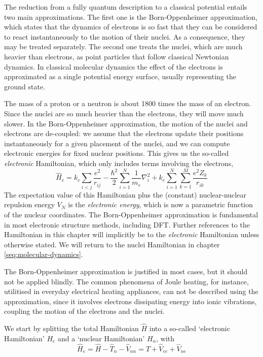 \documentclass[11pt,bibliography=totoc,index=totoc]{scrbook}   %
\begin{document}
The reduction from a fully quantum description to a classical potential entails two main approximations. The first one is the Born-Oppenheimer approximation, which states that the dynamics of electrons is so fast that they can be considered to react instantaneously to the motion of their nuclei. As a consequence, they may be treated separately. The second one treats the nuclei, which are much heavier than electrons, as point particles that follow classical Newtonian dynamics. In classical molecular dynamics the effect of the electrons is approximated as a single potential energy surface, usually representing the ground state.

The mass of a proton or a neutron is about 1800 times the mass of an electron.
Since the nuclei are so much heavier than the electrons, they will move much
slower. In the Born-Oppenheimer approximation, the motion of the 
nuclei and
electrons are de-coupled: we assume that the electrons update their positions
instantaneously for a given placement of the nuclei, and we can compute
electronic energies for fixed nuclear positions. This gives us the so-called
\emph{electronic} Hamiltonian, which only includes terms involving the
electrons,
\begin{equation}
  \hat{H}_e = 
	k_e  \sum_{i<j}\frac{e^2}{r_{ij}}
	-\frac{\hbar^2}{2}\sum_{i=1}^N\frac{1}{m_e}\nabla_i^2
		+ k_e \sum_{i=1}^N\sum_{k=1}^M \frac{e^2Z_k}{r_{ik}}
  \label{eq:el-hamiltonian}
\end{equation}
The expectation value of this Hamiltonian plus the (constant) nuclear-nuclear 
repulsion energy $V_N$ is the \emph{electronic energy}, which
is now a parametric function of the nuclear coordinates. The Born-Oppenheimer
approximation is fundamental in most electronic structure methods, including
DFT. Further references to the Hamiltonian in this chapter will implicitly 
be to the \emph{electronic} Hamiltonian unless otherwise stated. 
We will return to the nuclei Hamiltonian in chapter \ref{seq:molecular-dynamics}.



The Born-Oppenheimer approximation is justified in most 
cases,\cite[p. 111]{Cramer:2004} but it should not be applied blindly.
The common phenomena of Joule heating, for instance, utilitised in everyday electrical heating appliances, can not be described using the approximation, since it involves electrons dissipating energy into ionic vibrations, coupling the motion of the electrons and the nuclei.\cite{Horsfield:2004b}

We start by splitting the total Hamiltonian $\hat{H}$ into a so-called `electronic Hamiltonian' $H_e$ and a `nuclear Hamiltonian' $H_n$, with
\begin{equation}
  \hat{H}_e = \hat{H} - \hat{T}_n - \hat{V}_{nn} = \hat{T} + \hat{V}_{ee} + \hat{V}_{ne}
\end{equation}
\end{document}
